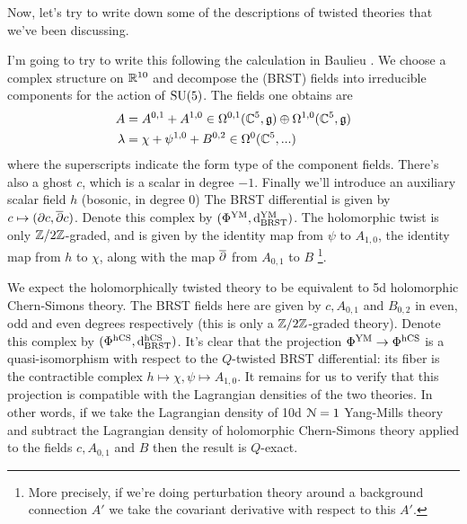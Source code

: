 \documentclass[10pt, oneside]{article}
\newcommand{\dBRST}{\mathrm d_{\mathrm{BRST}}}
\begin{document}
Now, let's try to write down some of the descriptions of twisted theories that we've been discussing.
\begin{example}[10d $\mc N=1$ Super Yang-Mills]
I'm going to try to write this following the calculation in Baulieu \cite{Baulieu}.  We choose a complex structure on $\mathbb{R}^{10}$ and decompose the (BRST) fields into irreducible components for the action of $\mathrm{SU}(5)$.  The fields one obtains are
\begin{align*}
A & = A^{0, 1} + A^{1, 0} \in \Omega^{0,1}(\mathbb{C}^5, \mathfrak{g}) \oplus \Omega^{1,0}(\mathbb{C}^5, \mathfrak{g}) \\
\lambda & = \chi + \psi^{1, 0} + B^{0, 2} \in \Omega^0(\mathbb{C}^5,...)
\end{align*}
where the superscripts indicate the form type of the component fields.  There's also a ghost $c$, which is a scalar in degree $-1$.  Finally we'll introduce an auxiliary scalar field $h$ (bosonic, in degree 0)   The BRST differential is given by $c \mapsto (\partial c, \overline{\partial} c)$.  Denote this complex by $(\Phi^{\mr{YM}}, \dBRST^{\mr{YM}})$.  The holomorphic twist is only $\mathbb{Z}/2\mathbb{Z}$-graded, and is given by the identity map from $\psi$ to $A_{1,0}$, the identity map from $h$ to $\chi$, along with the map $\overline{\partial}$ from $A_{0,1}$ to $B$ \footnote{More precisely, if we're doing perturbation theory around a background connection $A'$ we take the covariant derivative with respect to this $A'$.}.  

We expect the holomorphically twisted theory to be equivalent to 5d holomorphic Chern-Simons theory.  The BRST fields here are given by $c, A_{0,1}$ and $B_{0,2}$ in even, odd and even degrees respectively (this is only a $\mathbb{Z}/2\mathbb{Z}$-graded theory).  Denote this complex by $(\Phi^{\mr{hCS}},\dBRST^{\mr{hCS}})$.  It's clear that the projection $\Phi^{\mathrm{YM}} \to \Phi^{\mathrm{hCS}}$ is a quasi-isomorphism with respect to the $Q$-twisted BRST differential: its fiber is the contractible complex $h \mapsto \chi, \psi \mapsto A_{1,0}$.  It remains for us to verify that this projection is compatible with the Lagrangian densities of the two theories.  In other words, if we take the Lagrangian density of 10d $\mc N=1$ Yang-Mills theory and subtract the Lagrangian density of holomorphic Chern-Simons theory applied to the fields $c, A_{0,1}$ and $B$ then the result is $Q$-exact.


\end{example}
\end{document}
